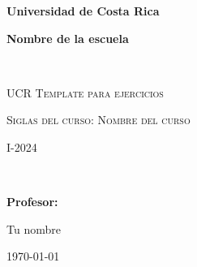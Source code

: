 
\begin{titlepage}
\centering
{\bfseries\LARGE Universidad de Costa Rica \par}
\vspace{0cm}
{\bfseries\LARGE Nombre de la escuela \par}
\vfill
\noindent\hrulefill \\
{\scshape\Huge UCR Template para ejercicios\par} %
\vspace{0.5cm}
{\scshape\Large Siglas del curso: Nombre del curso \par}
\vspace{0.5cm}
{\scshape\Large I-2024 \par} %
\noindent\hrulefill \\
\vfill
{\bfseries\Large Profesor: \par}
\vfill
{\Large Tu nombre\par}
\vfill
{\large\today \par} %
\end{titlepage}
\setcounter{page}{1}
\newpage